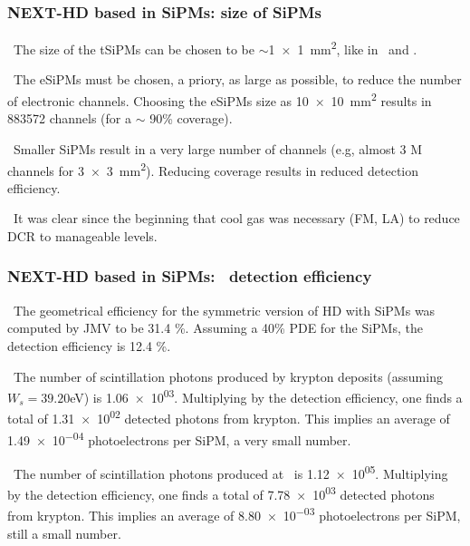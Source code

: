 \begin{frame}
\frametitle{NEXT-HD based in SiPMs: size of SiPMs}

\blt\ The size of the tSiPMs can be chosen to be $\sim$\SI{1 x 1}{mm^2}, like  in \New\ and \Next.

\blt\ The eSiPMs must be chosen, a priory, as large as possible, to reduce the number of electronic channels. Choosing the eSiPMs size as \SI{10 x 10}{mm^2} results in \num{883572} channels (for a $\sim$ 90\% coverage). 

\blt\ Smaller SiPMs result in a very large number of channels (e.g, almost 3 M channels for \SI{3 x 3}{mm^2}). Reducing coverage results in reduced detection efficiency. 

\blt\ It was clear since the beginning that cool gas was necessary (FM, LA) to reduce DCR to manageable levels. 
\end{frame}

\begin{frame}
\frametitle{NEXT-HD based in SiPMs: \sone\ detection efficiency}

\blt\ The geometrical efficiency for the symmetric version of HD with SiPMs was computed by JMV to be 31.4 \%. Assuming a 40\% PDE for the SiPMs, the detection efficiency is 12.4 \%. 

\blt\ The number of scintillation photons produced by krypton deposits (assuming 
$W_s = 39.20$eV) is \num{1.06e+03}. Multiplying by the detection efficiency, one finds a total of \num{1.31e+02} detected photons from krypton. This implies an average
of \num{1.49e-04} photoelectrons per SiPM, a very small number. 

\blt\ The number of scintillation photons produced at \Qbb\ is \num{1.12e+05}. Multiplying by the detection efficiency, one finds a total of \num{7.78e+03} detected photons from krypton. This implies an average
of \num{8.80e-03} photoelectrons per SiPM, still a small number. 

\end{frame}

